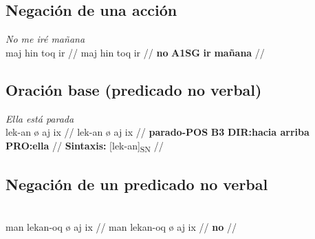\documentclass{article}%
\begin{document}
\subsection{Negación de una acción}%
\label{subsec:Negacindeunaaccin}%

%
\par\medskip%
\ex
\textit{No me iré mañana} \\
\begingl
\gla maj hin toq ir //
\glb maj hin toq ir //
\glc \textbf{no} \textbf{A1SG} \textbf{ir} \textbf{mañana} //
\endgl
\xe
%
\medskip%
\subsection{Oración base (predicado no verbal)}%
\label{subsec:Oracinbase(predicadonoverbal)}%

%
\par\medskip%
\ex
\textit{Ella está parada} \\
\begingl
\gla lek-an ø aj ix //
\glb lek-an ø aj ix //
\glc \textbf{parado-POS} \textbf{B3} \textbf{DIR:hacia arriba} \textbf{PRO:ella} //
\glft \textbf{Sintaxis:} [lek-an]\textsubscript{SN} //
\endgl
\xe
%
\medskip%
\subsection{Negación de un predicado no verbal}%
\label{subsec:Negacindeunpredicadonoverbal}%

%
\par\medskip%
\ex
\textit{} \\
\begingl
\gla man lekan-oq ø aj ix //
\glb man lekan-oq ø aj ix //
\glc \textbf{no} \textbf{} \textbf{} \textbf{} \textbf{} //
\endgl
\xe
%
\medskip

%
\end{document}
